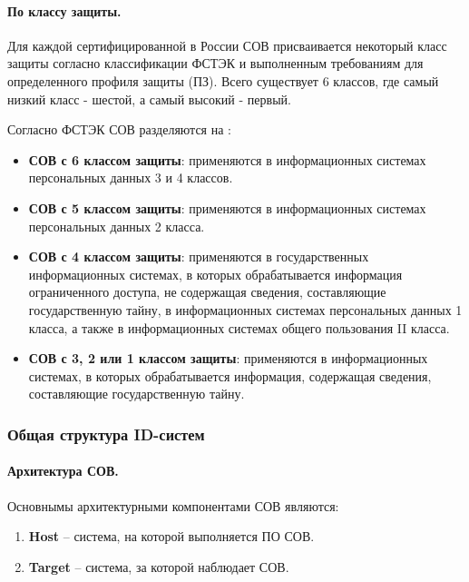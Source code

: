 \paragraph*{По классу защиты.}

Для каждой сертифицированной в России СОВ присваивается некоторый класс защиты
согласно классификации ФСТЭК и выполненным требованиям для определенного профиля защиты (ПЗ).
Всего существует 6 классов, где самый низкий класс - шестой, а самый высокий - первый.

Согласно ФСТЭК СОВ разделяются на \cite{IDSFSTEK}:
\begin{itemize}
	\item \textbf{СОВ с 6 классом защиты}: применяются в информационных системах
	персональных данных 3 и 4 классов.

	\item \textbf{СОВ с 5 классом защиты}: применяются в информационных системах
	персональных данных 2 класса.

	\item \textbf{СОВ с 4 классом защиты}: применяются в государственных информационных
	системах, в которых обрабатывается информация ограниченного доступа, не содержащая
	сведения, составляющие государственную тайну, в информационных системах персональных
	данных 1 класса, а также в информационных системах общего пользования II класса.

	\item \textbf{СОВ с 3, 2 или 1 классом защиты}: применяются в информационных системах,
	в которых обрабатывается информация, содержащая сведения, составляющие государственную
	тайну.
\end{itemize}



\subsubsection{Общая структура ID-систем}


\paragraph*{Архитектура СОВ.} Основнымы архитектурными компонентами СОВ являются:

\begin{enumerate}
	\item \textbf{Host} -- система, на которой выполняется ПО СОВ.

	\item \textbf{Target} -- система, за которой наблюдает СОВ.
\end{enumerate}

